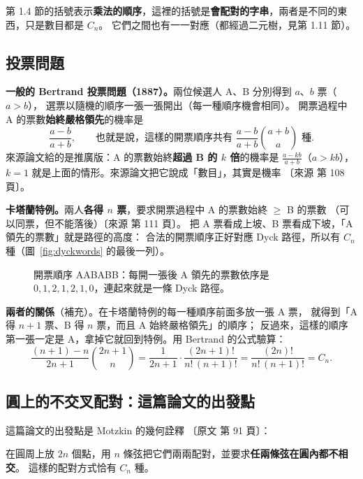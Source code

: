\documentclass[11pt,a4paper]{article}
\newcommand{\paper}[1]{{\small\color{gray!70!black}〔原文 #1〕}}
\newcommand{\src}[1]{{\small\color{gray!70!black}〔來源 #1〕}}  %
\begin{document}
\begin{notebox}[兩種括號別搞混]
第 1.4 節的括號表示\textbf{乘法的順序}，這裡的括號是\textbf{會配對的字串}，兩者是不同的東西，只是數目都是 $C_n$。
它們之間也有一一對應（都經過二元樹，見第 1.11 節）。
\end{notebox}

\subsection{投票問題}

\textbf{一般的 Bertrand 投票問題（1887）。}兩位候選人 A、B 分別得到 $a$、$b$ 票（$a>b$），
選票以隨機的順序一張一張開出（每一種順序機會相同）。
開票過程中 A 的票數\textbf{始終嚴格領先}的機率是
\[
\frac{a-b}{a+b},\qquad\text{也就是說，這樣的開票順序共有 }\frac{a-b}{a+b}\binom{a+b}{a}\text{ 種}.
\]
來源論文給的是推廣版：A 的票數始終\textbf{超過 B 的 $k$ 倍}的機率是 $\frac{a-kb}{a+b}$（$a>kb$），
$k=1$ 就是上面的情形。來源論文把它說成「數目」，其實是機率 \src{第 108 頁}。

\textbf{卡塔蘭特例。}兩人\textbf{各得 $n$ 票}，要求開票過程中 A 的票數始終 $\ge$ B 的票數
（可以同票，但不能落後）\src{第 111 頁}。
把 A 票看成上坡、B 票看成下坡，「A 領先的票數」就是路徑的高度：
合法的開票順序正好對應 Dyck 路徑，所以有 $C_n$ 種（圖~\ref{fig:dyckwords} 的最後一列）。

\begin{figure}[H]
\centering
\FigBallot
\caption{開票順序 AABABB：每開一張後 A 領先的票數依序是 $0,1,2,1,2,1,0$，連起來就是一條 Dyck 路徑。}
\label{fig:ballot}
\end{figure}

\textbf{兩者的關係}（補充）。在卡塔蘭特例的每一種順序前面多放一張 A 票，
就得到「A 得 $n+1$ 票、B 得 $n$ 票，而且 A 始終嚴格領先」的順序；
反過來，這樣的順序第一張一定是 A，拿掉它就回到特例。用 Bertrand 的公式驗算：
\[
\frac{(n+1)-n}{2n+1}\binom{2n+1}{n}=\frac{1}{2n+1}\cdot\frac{(2n+1)!}{n!\,(n+1)!}=\frac{(2n)!}{n!\,(n+1)!}=C_n .
\]

\subsection{圓上的不交叉配對：這篇論文的出發點}

這篇論文的出發點是 Motzkin 的幾何詮釋 \paper{第 91 頁}：

\begin{thmbox}
在圓周上放 $2n$ 個點，用 $n$ 條弦把它們兩兩配對，並要求\textbf{任兩條弦在圓內都不相交}。
這樣的配對方式恰有 $C_n$ 種。
\end{thmbox}
\end{document}
